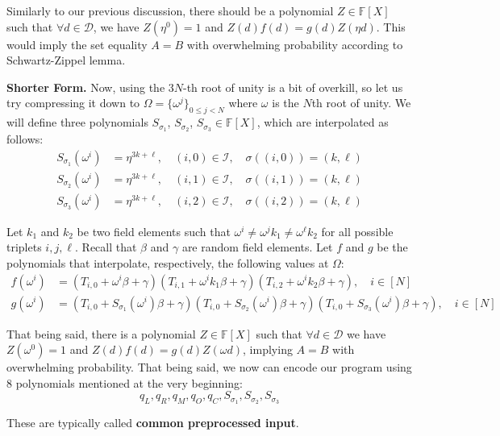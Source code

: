 \documentclass[../lecture-notes.tex]{subfiles}
\begin{document}
Similarly to our previous discussion, there should be a polynomial $Z \in
\mathbb{F}[X]$ such that $\forall d \in \mathcal{D}$, we have $Z(\eta^{0}) = 1$ and
$Z(d)f(d) = g(d)Z(\eta d)$. This would imply the set equality $A=B$ with
overwhelming probability according to Schwartz-Zippel lemma.

\textbf{Shorter Form.} Now, using the $3N$-th root of unity is a bit of overkill,
so let us try compressing it down to $\Omega = \{\omega^j\}_{0 \leq j < N}$
where $\omega$ is the $N$th root of unity. We will define three polynomials
$S_{\sigma_1}$, $S_{\sigma_2}$, $S_{\sigma_3} \in \mathbb{F}[X]$, which are
interpolated as follows:
\begin{align*}
    S_{\sigma_1}(\omega^i) &= \eta^{3k+\ell}, \quad (i, 0) \in \mathcal{I}, \quad \sigma((i, 0)) = (k, \ell) \\
    S_{\sigma_2}(\omega^i) &= \eta^{3k+\ell}, \quad (i, 1) \in \mathcal{I}, \quad \sigma((i, 1)) = (k, \ell) \\
    S_{\sigma_3}(\omega^i) &= \eta^{3k+\ell}, \quad (i, 2) \in \mathcal{I}, \quad \sigma((i, 2)) = (k, \ell)
\end{align*}

Let $k_1$ and $k_2$ be two field elements such that $\omega^i \neq \omega^j k_1
\neq \omega^{\ell} k_2$ for all possible triplets $i, j, \ell$. Recall that
$\beta$ and $\gamma$ are random field elements. Let $f$ and $g$ be the
polynomials that interpolate, respectively, the following values at $\Omega$:
\begin{align*}
    f(\omega^i) &=\left(T_{i,0} + \omega^i \beta + \gamma\right)\left(T_{i,1} + \omega^i k_1 \beta + \gamma\right)\left(T_{i,2} + \omega^i k_2 \beta + \gamma\right), \quad i \in [N] \\
    g(\omega^i) &= \left(T_{i,0} + S_{\sigma_1}(\omega^i) \beta + \gamma\right)\left(T_{i,0} + S_{\sigma_2}(\omega^i) \beta + \gamma\right)\left(T_{i,0} + S_{\sigma_3}(\omega^i) \beta + \gamma\right), \quad i \in [N]
\end{align*}

That being said, there is a polynomial $Z \in \mathbb{F}[X]$ such that $\forall
d \in \mathcal{D}$ we have $Z(\omega^{0}) = 1$ and $Z(d)f(d) = g(d)Z(\omega d)$,
implying $A = B$ with overwhelming probability. That being said, we now can
encode our program using 8 polynomials mentioned at the very beginning:
\[q_L, q_R, q_M, q_O, q_C, S_{\sigma_1}, S_{\sigma_2}, S_{\sigma_3}\]

These are typically called \textbf{common preprocessed input}.
\end{document}
